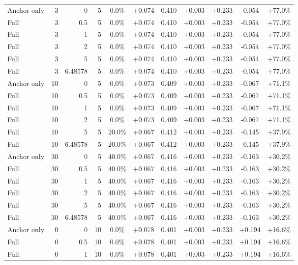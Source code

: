 \begin{table}[htbp]
\begin{tabular}{lrrrccccccc}
Anchor only & 3 & 0 & 5 & 0.0\% & +0.074 & 0.410 & +0.003 & +0.233 & -0.054 & +77.0\% \\
Full & 3 & 0.5 & 5 & 0.0\% & +0.074 & 0.410 & +0.003 & +0.233 & -0.054 & +77.0\% \\
Full & 3 & 1 & 5 & 0.0\% & +0.074 & 0.410 & +0.003 & +0.233 & -0.054 & +77.0\% \\
Full & 3 & 2 & 5 & 0.0\% & +0.074 & 0.410 & +0.003 & +0.233 & -0.054 & +77.0\% \\
Full & 3 & 5 & 5 & 0.0\% & +0.074 & 0.410 & +0.003 & +0.233 & -0.054 & +77.0\% \\
Full & 3 & 6.48578 & 5 & 0.0\% & +0.074 & 0.410 & +0.003 & +0.233 & -0.054 & +77.0\% \\
Anchor only & 10 & 0 & 5 & 0.0\% & +0.073 & 0.409 & +0.003 & +0.233 & -0.067 & +71.1\% \\
Full & 10 & 0.5 & 5 & 0.0\% & +0.073 & 0.409 & +0.003 & +0.233 & -0.067 & +71.1\% \\
Full & 10 & 1 & 5 & 0.0\% & +0.073 & 0.409 & +0.003 & +0.233 & -0.067 & +71.1\% \\
Full & 10 & 2 & 5 & 0.0\% & +0.073 & 0.409 & +0.003 & +0.233 & -0.067 & +71.1\% \\
Full & 10 & 5 & 5 & 20.0\% & +0.067 & 0.412 & +0.003 & +0.233 & -0.145 & +37.9\% \\
Full & 10 & 6.48578 & 5 & 20.0\% & +0.067 & 0.412 & +0.003 & +0.233 & -0.145 & +37.9\% \\
Anchor only & 30 & 0 & 5 & 40.0\% & +0.067 & 0.416 & +0.003 & +0.233 & -0.163 & +30.2\% \\
Full & 30 & 0.5 & 5 & 40.0\% & +0.067 & 0.416 & +0.003 & +0.233 & -0.163 & +30.2\% \\
Full & 30 & 1 & 5 & 40.0\% & +0.067 & 0.416 & +0.003 & +0.233 & -0.163 & +30.2\% \\
Full & 30 & 2 & 5 & 40.0\% & +0.067 & 0.416 & +0.003 & +0.233 & -0.163 & +30.2\% \\
Full & 30 & 5 & 5 & 40.0\% & +0.067 & 0.416 & +0.003 & +0.233 & -0.163 & +30.2\% \\
Full & 30 & 6.48578 & 5 & 40.0\% & +0.067 & 0.416 & +0.003 & +0.233 & -0.163 & +30.2\% \\
Anchor only & 0 & 0 & 10 & 0.0\% & +0.078 & 0.401 & +0.003 & +0.233 & +0.194 & +16.6\% \\
Full & 0 & 0.5 & 10 & 0.0\% & +0.078 & 0.401 & +0.003 & +0.233 & +0.194 & +16.6\% \\
Full & 0 & 1 & 10 & 0.0\% & +0.078 & 0.401 & +0.003 & +0.233 & +0.194 & +16.6\% \\

\end{tabular}
\end{table}
